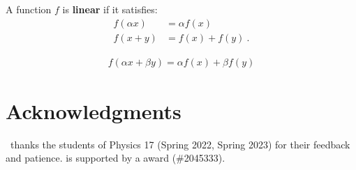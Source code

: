 \documentclass[12pt]{article}
\begin{document}

A function $f$ is \textbf{linear} if it satisfies:
\begin{align}
  f(\alpha x) &= \alpha f(x)\\
  f(x+y) &= f(x) + f(y) \ .
\end{align}

\begin{align}
  f(\alpha x + \beta y) = \alpha f(x)+\beta f(y)
  \label{eq:def:linear}
\end{align}



 \section*{Acknowledgments}

\ thanks the students of Physics 17 (Spring 2022, Spring 2023) for their feedback and patience.
%
 is supported by a  award (\#2045333).



% 
\end{document}
